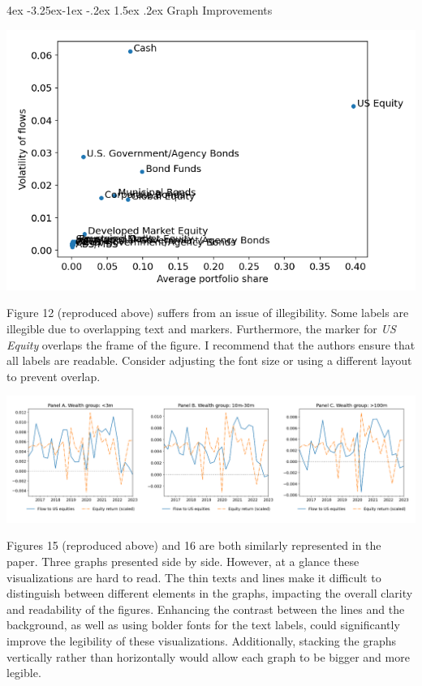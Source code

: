 \documentclass[]{article}
\makeatletter
\renewcommand\subsection{\leftskip 4ex\@startsection{subsection}{2}{\z@}%
	{-3.25ex\@plus -1ex \@minus -.2ex}%
	{1.5ex \@plus .2ex}%
	{\normalfont\large\bfseries}}
\makeatother
\begin{document}
\begin{spacing}{1.25}
	\subsection{Graph Improvements}
		\begin{center}
			\includegraphics[width=0.7\linewidth]{screenshot001}
		\end{center}		
		Figure 12 (reproduced above) suffers from an issue of illegibility. Some labels are illegible due to overlapping text and markers. Furthermore, the marker for \textit{US Equity} overlaps the frame of the figure. I recommend that the authors ensure that all labels are readable. Consider adjusting the font size or using a different layout to prevent overlap.
		
	
		\begin{center}
			\includegraphics[width=\linewidth]{screenshot002}
		\end{center}
		Figures 15 (reproduced above) and 16 are both similarly represented in the paper. Three graphs presented side by side. However, at a glance these visualizations are hard to read. The thin texts and lines make it difficult to distinguish between different elements in the graphs, impacting the overall clarity and readability of the figures. Enhancing the contrast between the lines and the background, as well as using bolder fonts for the text labels, could significantly improve the legibility of these visualizations. Additionally, stacking the graphs vertically rather than horizontally would allow each graph to be bigger and more legible.
	
		


\pagebreak
\printbibliography

\end{spacing}
\end{document}
